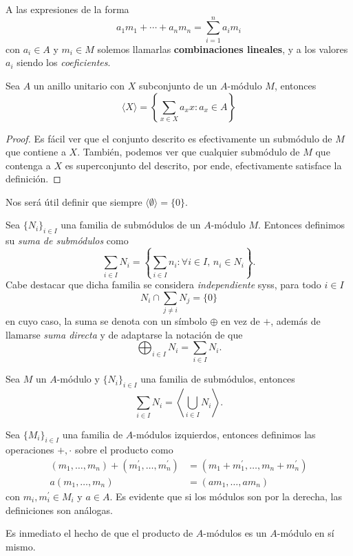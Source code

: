 \documentclass[11pt,oneside]{book}
\begin{document}
A las expresiones de la forma
$$a_1m_1+\cdots+a_nm_n=\sum_{i=1}^n a_im_i$$
con $a_i\in A$ y $m_i\in M$ solemos llamarlas \textbf{combinaciones lineales}, y a los valores $a_i$ siendo los \textit{coeficientes}.
\begin{thm}
Sea $A$ un anillo unitario con $X$ subconjunto de un $A$-módulo $M$, entonces
$$\langle X\rangle=\left\{\sum_{x\in X}a_xx:a_x\in A\right\}$$
\end{thm}
\begin{proof}
Es fácil ver que el conjunto descrito es efectivamente un submódulo de $M$ que contiene a $X$. También, podemos ver que cualquier submódulo de $M$ que contenga a $X$ es superconjunto del descrito, por ende, efectivamente satisface la definición.
\end{proof}
Nos será útil definir que siempre $\langle\emptyset\rangle=\{0\}$.
\begin{mydef}
Sea $\{N_i\}_{i\in I}$ una familia de submódulos de un $A$-módulo $M$. Entonces definimos su \textit{suma de submódulos} como
$$\sum_{i\in I}N_i=\left\{\sum_{i\in I}n_i:\forall i\in I,\,n_i\in N_i\right\}.$$
Cabe destacar que dicha familia se considera \textit{independiente} syss, para todo $i\in I$
$$N_i\cap\sum_{j\neq i}N_j=\{0\}$$
en cuyo caso, la suma se denota con un símbolo $\oplus$ en vez de $+$, además de llamarse \textit{suma directa} y de adaptarse la notación de que
$$\bigoplus_{i\in I}N_i=\sum_{i\in I}N_i.$$ 
\end{mydef}
\begin{thm}
Sea $M$ un $A$-módulo y $\{N_i\}_{i\in I}$ una familia de submódulos, entonces
$$\sum_{i\in I}N_i=\left\langle\bigcup_{i\in I}N_i\right\rangle.$$
\end{thm}
\begin{mydef}
Sea $\{M_i\}_{i\in I}$ una familia de $A$-módulos izquierdos, entonces definimos las operaciones $+,\cdot$ sobre el producto como
\begin{align*}
(m_1,\dots,m_n)+(m^{\prime}_1,\dots,m^{\prime}_n)&=(m_1+m_1^{\prime},\dots,m_n+m_n^{\prime})\\
a(m_1,\dots,m_n)&=(am_1,\dots,am_n)
\end{align*}
con $m_i,m_i^{\prime}\in M_i$ y $a\in A$. Es evidente que si los módulos son por la derecha, las definiciones son análogas.

Es inmediato el hecho de que el producto de $A$-módulos es un $A$-módulo en sí mismo.
\end{mydef}
\end{document}

